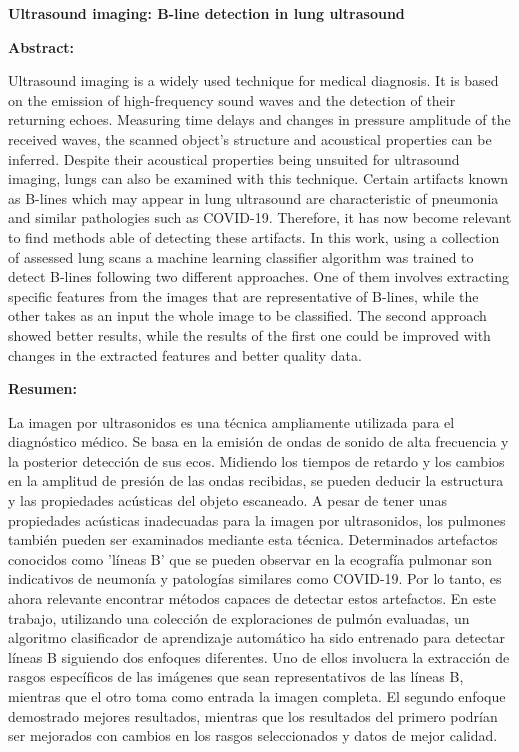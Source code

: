 \documentclass[12pt]{article} %
\begin{document}
{\bfseries \large Ultrasound imaging: B-line detection in lung ultrasound }\vspace{10mm} 

{\bfseries \large Abstract: }\vspace{5mm} 

Ultrasound imaging is a widely used technique for medical diagnosis. It is based on the emission of high-frequency sound waves and the detection of their returning echoes. Measuring time delays and changes in pressure amplitude of the received waves, the scanned object's structure and acoustical properties can be inferred. Despite their acoustical properties being unsuited for ultrasound imaging, lungs can also be examined with this technique. Certain artifacts known as B-lines which may appear in lung ultrasound are characteristic of pneumonia and similar pathologies such as COVID-19. Therefore, it has now become relevant to find methods able of detecting these artifacts. In this work, using a collection of assessed lung scans a machine learning classifier algorithm was trained to detect B-lines following two different approaches. One of them involves extracting specific features from the images that are representative of B-lines, while the other takes as an input the whole image to be classified. The second approach showed better results, while the results of the first one could be improved with changes in the extracted features and better quality data.
 
\vspace{1cm}

{\bfseries \large Resumen: }\vspace{5mm} 

La imagen por ultrasonidos es una técnica ampliamente utilizada para el diagnóstico médico. Se basa en la emisión de ondas de sonido de alta frecuencia y la posterior detección de sus ecos. Midiendo los tiempos de retardo y los cambios en la amplitud de presión de las ondas recibidas, se pueden deducir la estructura y las propiedades acústicas del objeto escaneado. A pesar de tener unas propiedades acústicas inadecuadas para la imagen por ultrasonidos, los pulmones también pueden ser examinados mediante esta técnica. Determinados artefactos conocidos como 'líneas B' que se pueden observar en la ecografía pulmonar son indicativos de neumonía y patologías similares como COVID-19. Por lo tanto, es ahora relevante encontrar métodos capaces de detectar estos artefactos. En este trabajo, utilizando una colección de exploraciones de pulmón evaluadas, un algoritmo clasificador de aprendizaje automático ha sido entrenado para detectar líneas B siguiendo dos enfoques diferentes. Uno de ellos involucra la extracción de rasgos específicos de las imágenes que sean representativos de las líneas B, mientras que el otro toma como entrada la imagen completa. El segundo enfoque demostrado mejores resultados, mientras que los resultados del primero podrían ser mejorados con cambios en los rasgos seleccionados y datos de mejor calidad.
\end{document}
